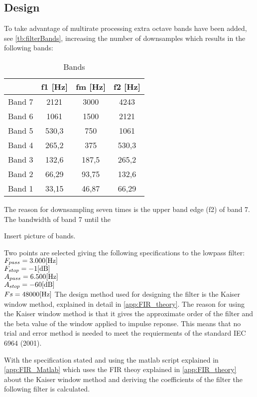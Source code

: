 \subsection*{Design}
To take advantage of multirate processing extra octave bands have been added, see \autoref{tb:filterBands}, increasing the number of downsamples which results in the following bands:
\begin{table}[H]
\centering
\begin{tabular}{|c|c|c|c|}
\hline
       & f1 {[}Hz{]} & fm {[}Hz{]} & f2 {[}Hz{]} \\ \hline
Band 7 & 2121        & 3000        & 4243        \\ \hline
Band 6 & 1061        & 1500        & 2121        \\ \hline
Band 5 & 530,3       & 750         & 1061        \\ \hline
Band 4 & 265,2       & 375         & 530,3       \\ \hline
Band 3 & 132,6       & 187,5       & 265,2       \\ \hline
Band 2 & 66,29       & 93,75       & 132,6       \\ \hline
Band 1 & 33,15       & 46,87       & 66,29       \\ \hline
\end{tabular}
\caption{Bands}
\label{tb:filterBands}
\end{table}   

The reason for downsampling seven times is the upper band edge (f2) of band 7. The bandwidth of band 7 until the 

Insert picture of bands.

Two points are selected giving the following specifications to the lowpass filter:
$F_{pass}=3.000 \enhed{Hz}$\\
$F_{stop}=-1 \enhed{dB}$\\
$A_{pass}=6.500 \enhed{Hz}$\\
$A_{stop}=-60 \enhed{dB}$\\
$Fs=48000 \enhed{Hz}$
The design method used for designing the filter is the Kaiser window method, explained in detail in \autoref{app:FIR_theory}. The reason for using the Kaiser window method is that it gives the approximate order of the filter and the beta value of the window applied to impulse reponse. This means that no trial and error method is needed to meet the requierments of the standard IEC 6964 (2001).

With the specification stated and using the matlab script explained in \autoref{app:FIR_Matlab} which uses the FIR theoy explained in \autoref{app:FIR_theory} about the Kaiser window method and deriving the coefficients of the filter the following filter is calculated. 

